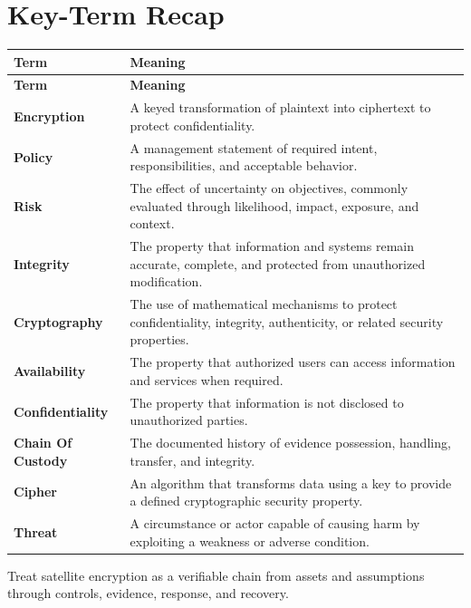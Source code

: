 \documentclass[11pt]{article}
\begin{document}
\section*{Key-Term Recap}
\begin{longtable}{>{\RaggedRight\arraybackslash}p{}>{\RaggedRight\arraybackslash}p{}}
\toprule\rowcolor{Navy}\color{white}\textbf{Term} & \color{white}\textbf{Meaning}\\\midrule
\endfirsthead
\toprule\rowcolor{Navy}\color{white}\textbf{Term} & \color{white}\textbf{Meaning}\\\midrule
\endhead
\textbf{Encryption} & A keyed transformation of plaintext into ciphertext to protect confidentiality. \\\midrule
\textbf{Policy} & A management statement of required intent, responsibilities, and acceptable behavior. \\\midrule
\textbf{Risk} & The effect of uncertainty on objectives, commonly evaluated through likelihood, impact, exposure, and context. \\\midrule
\textbf{Integrity} & The property that information and systems remain accurate, complete, and protected from unauthorized modification. \\\midrule
\textbf{Cryptography} & The use of mathematical mechanisms to protect confidentiality, integrity, authenticity, or related security properties. \\\midrule
\textbf{Availability} & The property that authorized users can access information and services when required. \\\midrule
\textbf{Confidentiality} & The property that information is not disclosed to unauthorized parties. \\\midrule
\textbf{Chain Of Custody} & The documented history of evidence possession, handling, transfer, and integrity. \\\midrule
\textbf{Cipher} & An algorithm that transforms data using a key to provide a defined cryptographic security property. \\\midrule
\textbf{Threat} & A circumstance or actor capable of causing harm by exploiting a weakness or adverse condition. \\\midrule
\bottomrule
\end{longtable}
\begin{takeawaybox}
Treat satellite encryption as a verifiable chain from assets and assumptions through controls, evidence, response, and recovery.
\end{takeawaybox}
\end{document}
